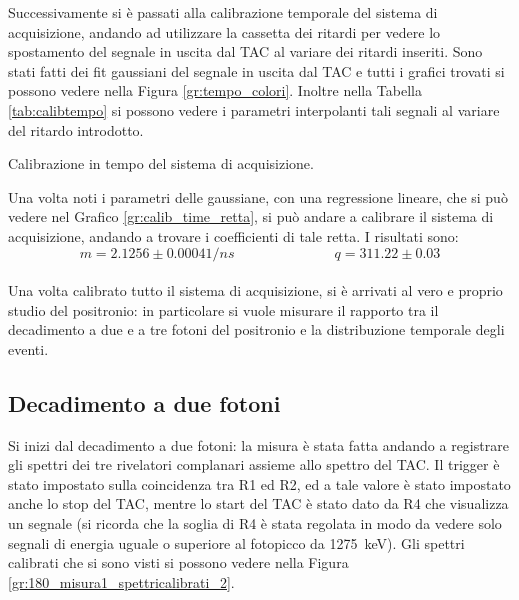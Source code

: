 Successivamente si è passati alla calibrazione temporale del sistema di acquisizione, andando ad utilizzare la cassetta dei ritardi per vedere lo spostamento del
segnale in uscita dal TAC al variare dei ritardi inseriti. Sono stati fatti dei fit gaussiani del segnale in uscita dal TAC e tutti i grafici trovati si possono
vedere nella Figura \ref{gr:tempo_colori}. Inoltre nella Tabella \ref{tab:calibtempo} si possono vedere i parametri interpolanti tali segnali
al variare del ritardo introdotto.\\

\begin{table}[h]
	\centering
	
	\caption{Calibrazione in tempo del sistema di acquisizione.}
	\label{tab:calibtempo}
\end{table}

Una volta noti i parametri delle gaussiane, con una regressione lineare, che si può vedere nel Grafico \ref{gr:calib_time_retta}, si può andare a calibrare il sistema di
acquisizione, andando a trovare i coefficienti di tale retta. I risultati sono:
$$ m= 2.1256 \pm 0.0004 1/ns \hspace{3cm} q = 311.22 \pm 0.03$$\\



Una volta calibrato tutto il sistema di acquisizione, si è arrivati al vero e proprio studio del positronio: in particolare si vuole misurare il rapporto tra il decadimento
a due e a tre fotoni del positronio e la distribuzione temporale degli eventi.\\

\FloatBarrier
\subsection{Decadimento a due fotoni}

Si inizi dal decadimento a due fotoni: la misura è stata fatta andando a registrare gli spettri dei tre rivelatori complanari assieme allo spettro del TAC. Il
trigger è stato impostato sulla coincidenza tra R1 ed R2, ed a tale valore è stato impostato anche lo stop del TAC, mentre lo start del TAC è stato dato da R4 che visualizza
un segnale (si ricorda che la soglia di R4 è stata regolata in modo da vedere solo segnali di energia uguale o superiore al fotopicco da 1275~keV). Gli spettri calibrati che
si sono visti si possono vedere nella Figura \ref{gr:180_misura1_spettricalibrati_2}.\\


